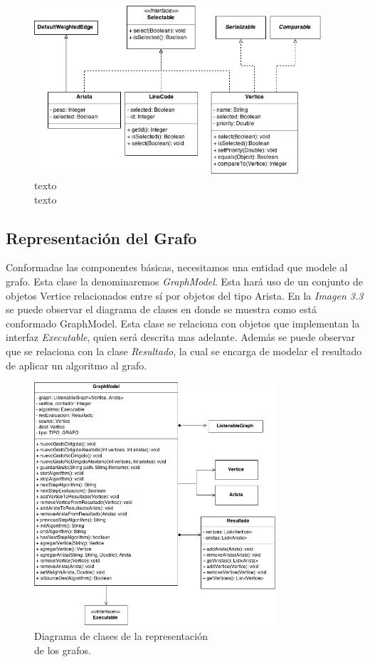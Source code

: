 \documentclass{book}
\begin{document}
\begin{figure}[H]
	\centering
	\includegraphics[width=0.95\textwidth]{images/01-01.png}
	\medskip
	\caption{texto \\ texto}
	\medskip
\end{figure}
\medskip



\subsection{Representación del Grafo}

Conformadas las componentes básicas, necesitamos una entidad que modele al grafo. Esta clase la denominaremos \textit{GraphModel}. Esta hará uso de un conjunto de objetos Vertice relacionados entre sí por objetos del tipo Arista. En la \textit{Imagen 3.3} se puede observar el diagrama de clases en donde se muestra como está conformado GraphModel. Esta clase se relaciona con objetos que implementan la interfaz \textit{Executable}, quien será descrita mas adelante. Además se puede observar que se relaciona con la clase \textit{Resultado}, la cual se encarga de modelar el resultado de aplicar un algoritmo al grafo.
\bigskip\bigskip 


\begin{figure}[H]
	\centering
	\includegraphics[width=0.8\textwidth]{images/01-03.png}
	\medskip
	\caption{Diagrama de clases de la representación \\ de los grafos.}
	\medskip
\end{figure}
\bigskip
\end{document}
